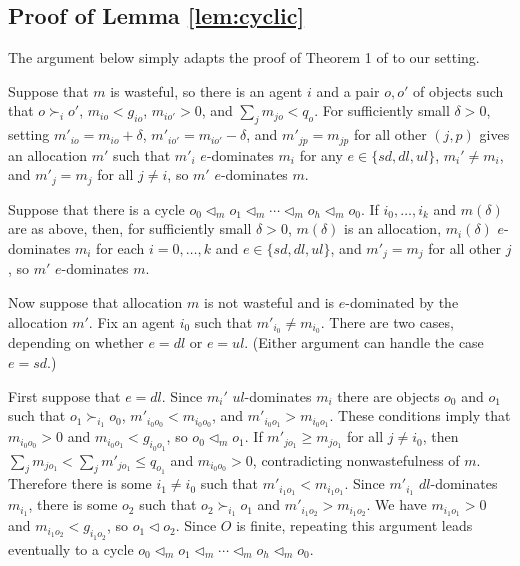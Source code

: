 \documentclass[12pt]{article}
\theoremstyle{definition}
\begin{document}
\begin{appendix}

\section{Proof of Lemma \ref{lem:cyclic}} \label{app:Cyclic}

 The argument below simply adapts the proof of Theorem 1 of \cite{cd16} to our setting.
 
Suppose that $m$ is wasteful, so there is an agent $i$ and a pair $o,o'$ of objects such that $o \succ_i o'$, $m_{io} < g_{io}$, $m_{io'} > 0$, and $\sum_j m_{jo} < q_o$. For sufficiently small $\delta > 0$, setting $m'_{io} = m_{io}+\delta$,  $m'_{io'} = m_{io'} - \delta$, and $m'_{jp} = m_{jp}$ for all other $(j,p)$ gives an allocation $m'$ such that $m'_i$ $e$-dominates $m_i$ for any $e \in \{sd,dl,ul\}$, $m_i' \ne m_i$, and $m'_j = m_j$ for all $j \ne i$, so $m'$ $e$-dominates $m$. 

Suppose that there is a cycle $o_0 \lhd_m o_1 \lhd_m \cdots \lhd_m o_h \lhd_m o_0$.
If $i_0, \ldots, i_k$ and $m(\delta)$ are as above, then, for sufficiently small $\delta >0$, $m(\delta)$ is an allocation, $m_i(\delta)$ $e$-dominates $m_i$  for each $i = 0, \ldots, k$ and $e \in \{sd,dl,ul\}$, and $m'_j = m_j$ for all other $j$, so $m'$ $e$-dominates $m$.

Now suppose that allocation $m$ is not wasteful and is $e$-dominated by the allocation $m'$.   Fix an agent $i_0$ such that $m'_{i_0} \ne m_{i_0}$. 
There are two cases, depending on whether $e = dl$ or $e = ul$.  (Either argument can handle the case $e = sd$.)

First suppose that $e = dl$.  Since $m_i'$ $ul$-dominates $m_i$ there are objects $o_0$ and $o_1$  such that $o_1 \succ_{i_1} o_0$, $m'_{i_0o_0} < m_{i_0o_0}$, and $m'_{i_0o_1} > m_{i_0o_1}$.  These conditions imply that $m_{i_0o_0} > 0$ and $m_{i_0o_1} < g_{i_0o_1}$, so $o_0 \lhd_m o_1$. 
If $m'_{jo_1} \ge m_{jo_1}$ for all $j \ne i_0$, then $\sum_j m_{jo_1} < \sum_j m'_{jo_1} \le q_{o_1}$ and $m_{i_0o_0} > 0$, contradicting nonwastefulness of $m$.  Therefore there is some $i_1 \ne i_0$ such that $m'_{i_1o_1} < m_{i_1o_1}$.  Since $m'_{i_1}$ $dl$-dominates $m_{i_1}$, there is some $o_2$ such that $o_2 \succ_{i_1} o_1$ and $m'_{i_1o_2} > m_{i_1o_2}$.  We have $m_{i_1o_1} > 0$ and $m_{i_1o_2} < g_{i_1o_2}$, so $o_1 \lhd o_2$.
Since $O$ is finite, repeating this argument leads eventually to a cycle $o_0 \lhd_m o_1 \lhd_m \cdots \lhd_m o_h \lhd_m o_0$.


\end{appendix}
\end{document}
